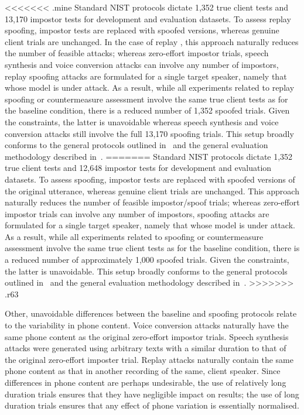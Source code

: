 <<<<<<< .mine
Standard NIST protocols dictate 1,352 true client tests and 13,170 impostor tests for development and evaluation datasets. 
To assess replay spoofing, impostor tests are replaced with spoofed versions, whereas genuine client trials are unchanged.
In the case of replay , this approach naturally reduces the number of feasible attacks; whereas zero-effort impostor trials, speech synthesis and voice conversion attacks can involve any number of impostors, replay spoofing attacks are formulated for a single target speaker, namely that whose model is under attack.  As a result, while all experiments related to replay spoofing or countermeasure assessment involve the same true client tests as for the baseline condition, there is a reduced number of 1,352 spoofed trials.  Given the constraints, the latter is unavoidable whereas speech synthesis and voice conversion attacks still involve the full 13,170 spoofing trials.  This setup broadly conforms to the general protocols outlined in~\cite{Wu2014a,Wu2015} and the general evaluation methodology described in~\cite{Hadid2015}.
=======
Standard NIST protocols dictate 1,352 true client tests and 12,648 impostor tests for development and evaluation datasets. 
To assess spoofing, impostor tests are replaced with spoofed versions of the original utterance, whereas genuine client trials are unchanged.
This approach naturally reduces the number of feasible impostor/spoof trials; whereas zero-effort impostor trials can involve any number of impostors, spoofing attacks are formulated for a single target speaker, namely that whose model is under attack.  As a result, while all experiments related to spoofing or countermeasure assessment involve the same true client tests as for the baseline condition, there is a reduced number of approximately 1,000 spoofed trials.  Given the constraints, the latter is unavoidable.  This setup broadly conforms to the general protocols outlined in~\cite{Wu2014a,Wu2015} and the general evaluation methodology described in~\cite{Hadid2015}.
>>>>>>> .r63


Other, unavoidable differences between the baseline and spoofing protocols relate to the variability in phone content.  Voice conversion attacks naturally have the same phone content as the original zero-effort impostor trials.  Speech synthesis attacks were generated using arbitrary texts with a similar duration to that of the original zero-effort imposter trial.  Replay attacks naturally contain the same phone content as that in another recording of the same, client speaker.  Since differences in phone content are perhaps undesirable, the use of relatively long duration trials ensures that they have negligible impact on results; the use of long duration trials ensures that any effect of phone variation is essentially normalised.  



